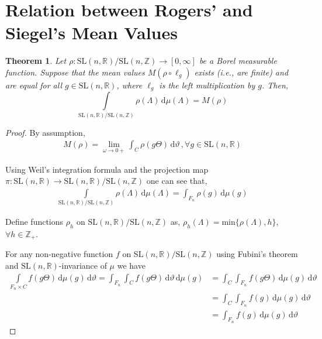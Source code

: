 \documentclass[11pt]{article}
\newtheorem{theorem}{Theorem}[section]
\theoremstyle{definition}
\theoremstyle{proof}
\begin{document}
\section{Relation between Rogers' and Siegel's Mean Values}
\begin{theorem}\label{rmveqsmv}
    Let $\rho : \mathrm{SL}(n,\mathbb{R})/\mathrm{SL}(n,\mathbb{Z}) \to [0, \infty]$ be a Borel measurable function.
    Suppose that the mean values $M(\rho \circ \ell_g)$ exists (i.e., are finite) and are equal for all $g \in \mathrm{SL}(n,\mathbb{R})$, where $\ell_g$ is the left multiplication by $g$.
    Then,
    \[
        \int\limits_{\mathrm{SL}(n,\mathbb{R})/\mathrm{SL}(n,\mathbb{Z})} \rho (\Lambda )\, \mathrm{d} \mu (\Lambda ) = M(\rho )
    \]
\end{theorem}
\begin{proof}
    By assumption,
    \begin{align}\label{eqassumption}
        M(\rho )  = \lim_{\omega \to 0+}\int_{C}\rho (g \Theta ) \, \mathrm{d} \vartheta \, , \forall g \in \mathrm{SL}(n,\mathbb{R})
    \end{align}

    Using Weil's integration formula and the projection map $\pi : \mathrm{SL}(n,\mathbb{R}) \to \mathrm{SL}(n,\mathbb{R})/\mathrm{SL}(n,\mathbb{Z})$ one can see that,
    \begin{align}\label{intrho}
        \int\limits_{\mathrm{SL}(n,\mathbb{R})/\mathrm{SL}(n,\mathbb{Z})} \rho (\Lambda ) \, \mathrm{d} \mu (\Lambda ) = \int_{F_n} \rho (g) \, \mathrm{d} \mu (g)
    \end{align}

    Define functions $\rho _h$ on $\mathrm{SL}(n,\mathbb{R})/\mathrm{SL}(n,\mathbb{Z})$ as, $\rho _h(\Lambda ) = \text{min} \{\rho (\Lambda ), h\}$, $\forall h \in \mathbb{Z}_+$.

    For any non-negative function $f$ on $\mathrm{SL}(n,\mathbb{R})/\mathrm{SL}(n,\mathbb{Z})$ using Fubini's theorem and $\mathrm{SL}(n,\mathbb{R})$-invariance of $\mu$ we have
    \begin{align*}
        \int\limits_{F_n \times C} f (g \Theta ) \, \mathrm{d} \mu (g) \, \mathrm{d} \vartheta = \int_{F_n}\int_{C} f(g \Theta ) \, \mathrm{d} \vartheta \, \mathrm{d} \mu (g) &= \int_{C} \int_{F_n}f (g \Theta ) \, \mathrm{d} \mu (g) \, \mathrm{d} \vartheta \\
        &= \int_{C} \int_{F_n} f(g) \, \mathrm{d} \mu (g) \, \mathrm{d} \vartheta \\
        &= \int_{F_n} f(g) \, \mathrm{d} \mu (g) \, \mathrm{d} \vartheta 
    \end{align*}


\end{proof}
\end{document}
